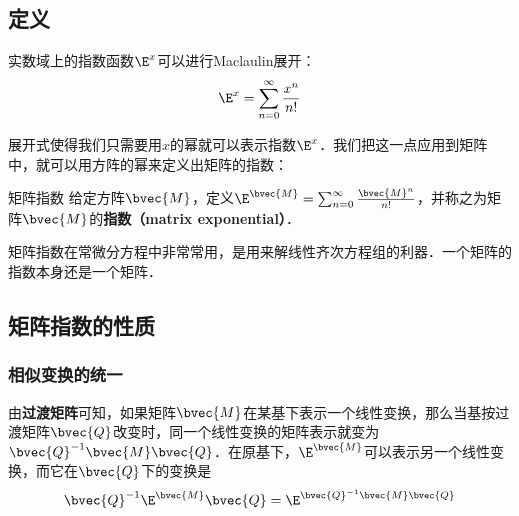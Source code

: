 

\subsection{定义}
实数域上的指数函数$\E^x$可以进行Maclaulin展开：\begin{equation}
\E^x=\sum\limits_{n=0}^\infty \frac{x^n}{n!}
\end{equation}

展开式使得我们只需要用$x$的幂就可以表示指数$\E^x$．我们把这一点应用到矩阵中，就可以用方阵的幂来定义出矩阵的指数：

\begin{definition}{矩阵指数}
给定方阵$\bvec{M}$，定义$\E^\bvec{M}=\sum_{n=0}^\infty \frac{\bvec{M}^n}{n!}$，并称之为矩阵$\bvec{M}$的\textbf{指数（matrix exponential）}．
\end{definition}

矩阵指数在常微分方程中非常常用，是用来解线性齐次方程组的利器．一个矩阵的指数本身还是一个矩阵．

\subsection{矩阵指数的性质}

\subsubsection{相似变换的统一}

由\textbf{过渡矩阵}可知，如果矩阵$\bvec{M}$在某基下表示一个线性变换，那么当基按过渡矩阵$\bvec{Q}$改变时，同一个线性变换的矩阵表示就变为$\bvec{Q}^{-1}\bvec{M}\bvec{Q}$．在原基下，$\E^\bvec{M}$可以表示另一个线性变换，而它在$\bvec{Q}$下的变换是
\begin{equation}
\bvec{Q}^{-1}\E^\bvec{M}\bvec{Q}=\E^{\bvec{Q}^{-1}\bvec{M}\bvec{Q}}
\end{equation}







